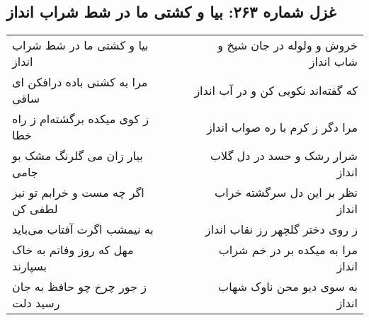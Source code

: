 \begin{center}
\section*{غزل شماره ۲۶۳: بیا و کشتی ما در شط شراب انداز}
\label{sec:sh263}
\begin{longtable}{l p{0.5cm} r}
بیا و کشتی ما در شط شراب انداز
&&
خروش و ولوله در جان شیخ و شاب انداز
\\
مرا به کشتی باده درافکن ای ساقی
&&
که گفته‌اند نکویی کن و در آب انداز
\\
ز کوی میکده برگشته‌ام ز راه خطا
&&
مرا دگر ز کرم با ره صواب انداز
\\
بیار زان می گلرنگ مشک بو جامی
&&
شرار رشک و حسد در دل گلاب انداز
\\
اگر چه مست و خرابم تو نیز لطفی کن
&&
نظر بر این دل سرگشته خراب انداز
\\
به نیمشب اگرت آفتاب می‌باید
&&
ز روی دختر گلچهر رز نقاب انداز
\\
مهل که روز وفاتم به خاک بسپارند
&&
مرا به میکده بر در خم شراب انداز
\\
ز جور چرخ چو حافظ به جان رسید دلت
&&
به سوی دیو محن ناوک شهاب انداز
\\
\end{longtable}
\end{center}
